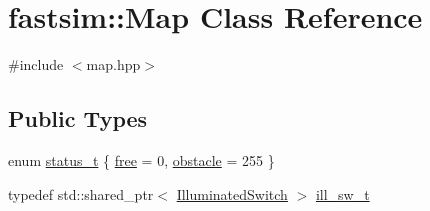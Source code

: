 \hypertarget{classfastsim_1_1_map}{}\section{fastsim\+:\+:Map Class Reference}
\label{classfastsim_1_1_map}


{\ttfamily \#include $<$map.\+hpp$>$}

\subsection*{Public Types}
\begin{DoxyCompactItemize}
\item 
enum \hyperlink{classfastsim_1_1_map_ae0ff811304fed4a4ca33e4676534a9aa}{status\+\_\+t} \{ \hyperlink{classfastsim_1_1_map_ae0ff811304fed4a4ca33e4676534a9aaa734d9138767d64430ca5ed54d15809fe}{free} = 0, 
\hyperlink{classfastsim_1_1_map_ae0ff811304fed4a4ca33e4676534a9aaab3747fd718def41be345baf801721804}{obstacle} = 255
 \}
\item 
typedef std\+::shared\+\_\+ptr$<$ \hyperlink{classfastsim_1_1_illuminated_switch}{Illuminated\+Switch} $>$ \hyperlink{classfastsim_1_1_map_a998d356ac6ce470e714e8945150eac6e}{ill\+\_\+sw\+\_\+t}
\end{DoxyCompactItemize}
